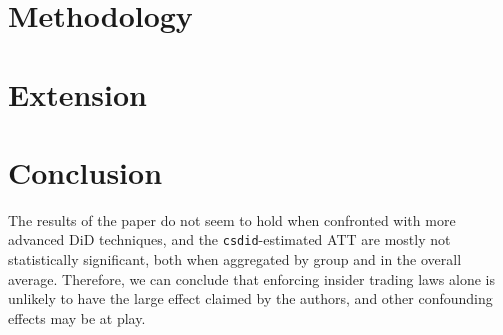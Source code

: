\documentclass[12pt]{article}
\begin{document}
    \section{Methodology}\label{sec:methodology}
    

    \pagebreak

    \section{Extension}\label{sec:extension}
    

    \pagebreak

    \section{Conclusion}\label{sec:conclusion}
    The results of the paper do not seem to hold when confronted with more advanced DiD techniques, and the \texttt{csdid}-estimated ATT are mostly not statistically significant, both when aggregated by group and in the overall average.
    Therefore, we can conclude that enforcing insider trading laws alone is unlikely to have the large effect claimed by the authors, and other confounding effects may be at play.

    \printbibliography
\end{document}
